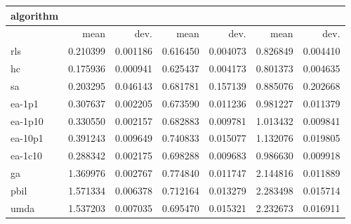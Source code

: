 \begin{tabular}{@{}l*{6}{>{{}}N{1}{2}}@{}}
\toprule
{algorithm} &  &  &  \\
\midrule
& {mean} & {dev.} & {mean} & {dev.} & {mean} & {dev.} \\
\midrule
rls & 0.210399 & 0.001186 & 0.616450 & 0.004073 & 0.826849 & 0.004410 \\
 hc & 0.175936 & 0.000941 & 0.625437 & 0.004173 & 0.801373 & 0.004635 \\
 sa & 0.203295 & 0.046143 & 0.681781 & 0.157139 & 0.885076 & 0.202668 \\
 ea-1p1 & 0.307637 & 0.002205 & 0.673590 & 0.011236 & 0.981227 & 0.011379 \\
 ea-1p10 & 0.330550 & 0.002157 & 0.682883 & 0.009781 & 1.013432 & 0.009841 \\
 ea-10p1 & 0.391243 & 0.009649 & 0.740833 & 0.015077 & 1.132076 & 0.019805 \\
 ea-1c10 & 0.288342 & 0.002175 & 0.698288 & 0.009683 & 0.986630 & 0.009918 \\
 ga & 1.369976 & 0.002767 & 0.774840 & 0.011747 & 2.144816 & 0.011889 \\
 pbil & 1.571334 & 0.006378 & 0.712164 & 0.013279 & 2.283498 & 0.015714 \\
 umda & 1.537203 & 0.007035 & 0.695470 & 0.015321 & 2.232673 & 0.016911 \\
 \bottomrule
\end{tabular}
